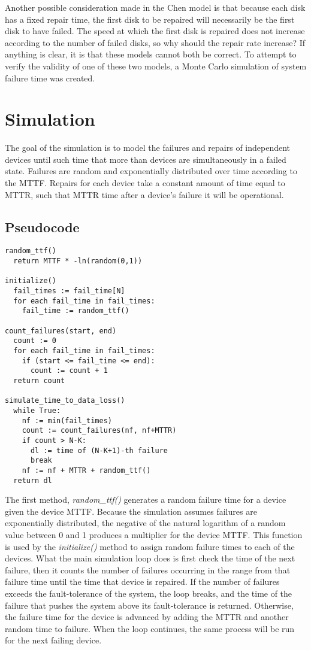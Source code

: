 \documentclass[XXX,endnotes]{usetex-v1}
\begin{document}
Another possible consideration made in the Chen model is that because each disk has a fixed repair time, the first disk to be repaired will necessarily be the first disk to have failed.  The speed at which the first disk is repaired does not increase according to the number of failed disks, so why should the repair rate increase?  If anything is clear, it is that these models cannot both be correct.  To attempt to verify the validity of one of these two models, a Monte Carlo simulation of system failure time was created. 

\section{Simulation}

The goal of the simulation is to model the failures and repairs of  independent devices until such time that more than  devices are simultaneously in a failed state.  Failures are random and exponentially distributed over time according to the MTTF.  Repairs for each device take a constant amount of time equal to MTTR, such that MTTR time after a device's failure it will be operational.

\subsection{Pseudocode}

\begin{small}
\begin{verbatim}
random_ttf()
  return MTTF * -ln(random(0,1))

initialize()
  fail_times := fail_time[N]
  for each fail_time in fail_times:
    fail_time := random_ttf()

count_failures(start, end)
  count := 0
  for each fail_time in fail_times:
    if (start <= fail_time <= end):
      count := count + 1
  return count

simulate_time_to_data_loss()
  while True:
    nf := min(fail_times)
    count := count_failures(nf, nf+MTTR)
    if count > N-K:
      dl := time of (N-K+1)-th failure
      break
    nf := nf + MTTR + random_ttf()
  return dl
\end{verbatim}
\end{small}

The first method, \emph{random\_ttf()} generates a random failure time for a device given the device MTTF.  Because the simulation assumes failures are exponentially distributed, the negative of the natural logarithm of a random value between 0 and 1 produces a multiplier for the device MTTF.  This function is used by the \emph{initialize()} method to assign random failure times to each of the  devices.  What the main simulation loop does is first check the time of the next failure, then it counts the number of failures occurring in the range from that failure time until the time that device is repaired.  If the number of failures exceeds the fault-tolerance of the system, the loop breaks, and the time of the failure that pushes the system above its fault-tolerance is returned.  Otherwise, the failure time for the device is advanced by adding the MTTR and another random time to failure.  When the loop continues, the same process will be run for the next failing device.
\end{document}
